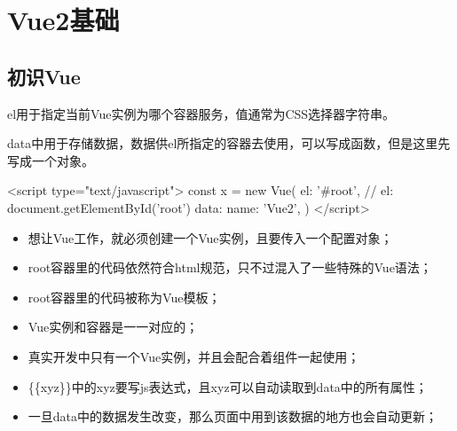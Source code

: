 \chapter{Vue2基础}
\section{初识Vue}
el用于指定当前Vue实例为哪个容器服务，值通常为CSS选择器字符串。

data中用于存储数据，数据供el所指定的容器去使用，可以写成函数，但是这里先写成一个对象。
\begin{html}
    <script type="text/javascript">
    const x = new Vue({
    el: '#root',
    // el: document.getElementById('root')
    data: {
    name: 'Vue2',
    }
    })
    </script>
\end{html}

\begin{itemize}
    \item 想让Vue工作，就必须创建一个Vue实例，且要传入一个配置对象；
    \item root容器里的代码依然符合html规范，只不过混入了一些特殊的Vue语法；
    \item root容器里的代码被称为Vue模板；
    \item Vue实例和容器是一一对应的；
    \item 真实开发中只有一个Vue实例，并且会配合着组件一起使用；
    \item \{\{xyz\}\}中的xyz要写js表达式，且xyz可以自动读取到data中的所有属性；
    \item 一旦data中的数据发生改变，那么页面中用到该数据的地方也会自动更新；
\end{itemize}
